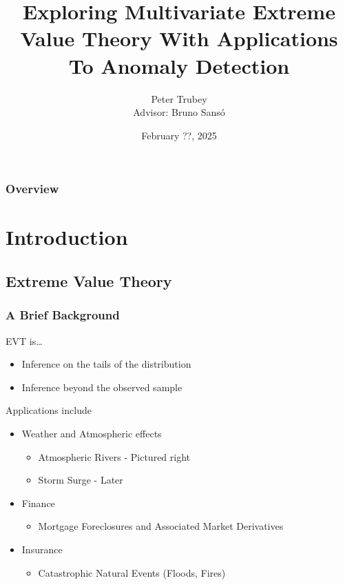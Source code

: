 \documentclass[aspectratio=169,10pt]{beamer}
\title{Exploring Multivariate Extreme Value Theory With 
    Applications To Anomaly Detection}
\author{Peter Trubey \\ Advisor: Bruno Sans{\'o}}
\institute{Department of Statistics - UCSC}
\date[2/??/2025]{February ??, 2025}
\begin{document}
\begin{frame}[plain]
  \titlepage
\end{frame}

\begin{frame}[plain]
  \frametitle{Overview}
  \tableofcontents
\end{frame}

\section{Introduction}
\subsection{Extreme Value Theory}

\begin{frame}
    \frametitle{A Brief Background}
    \begin{minipage}{0.64\textwidth}
    EVT is\ldots
    \begin{itemize}
        \item Inference on the tails of the distribution
        \item Inference beyond the observed sample
    \end{itemize}
    Applications include
    \begin{itemize}
        \item Weather and Atmospheric effects
        \begin{itemize}
            \item Atmospheric Rivers - Pictured right
            \item Storm Surge - Later
        \end{itemize}
        \item Finance
        \begin{itemize}
            \item Mortgage Foreclosures and Associated Market Derivatives
        \end{itemize}
        \item Insurance
        \begin{itemize}
            \item Catastrophic Natural Events (Floods, Fires)
        \end{itemize}
    \end{itemize}
    \end{minipage} %
    \begin{minipage}{.35\textwidth}
    \centering

\end{minipage}
\end{frame}
\end{document}

